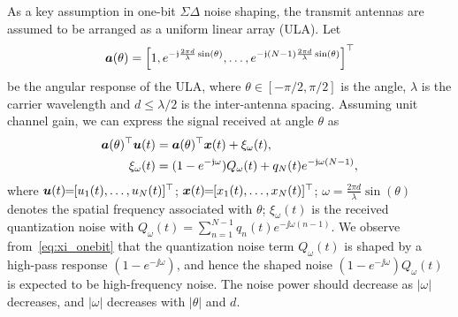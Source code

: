 \documentclass[10pt,twocolumn,twoside]{IEEEtran}
\begin{document}
As a key assumption in one-bit $\Sigma \Delta$ noise shaping, the transmit antennas are assumed to be arranged as a uniform linear array (ULA).
Let
\begin{equation}\label{eq:angular_response}
	{\bm a}(\theta) = \left[ 1,e^{-{\mathfrak j}\frac{2\pi d}{\lambda}\sin(\theta)}, \dots, e^{-{\mathfrak j}(N-1)\frac{2\pi d}{\lambda}\sin(\theta)} \right]^\top
\end{equation}
be the angular response of the ULA,
where
$\theta \in [-\pi/2,\pi/2]$ is the angle,
$\lambda$ is the carrier wavelength
and $d \le {\lambda}/{2}$ is the inter-antenna spacing.
Assuming unit channel gain, we can express the signal received at angle $\theta$ as
\begin{align}
	{\bm a}(\theta)^\top {\bm u}(t) &= {\bm a}(\theta)^\top {\bm x}(t) + \xi_\omega(t), \notag\\
	\xi_\omega(t) &= (1 - e^{-{\mathfrak j} \omega})  Q_\omega(t)  +  q_N(t) e^{- {\mathfrak j} \omega(N-1)}, \label{eq:xi_onebit}
\end{align}
where
${\bm u}(t) \!\!=\!\! [u_1(t),\dots,u_N(t)]^\top$;
${\bm x}(t) \!\!=\!\! [x_1(t),\dots,x_N(t)]^\top$;
$\omega \!=\! \frac{2\pi d}{\lambda} \sin(\theta)$ denotes the spatial frequency associated with $\theta$;
$\xi_\omega(t)$ is the received quantization noise with
$Q_\omega(t) \!=\! \sum_{n=1}^{N-1} \! q_n(t) e^{-\jj \omega(n-1)}$.
We observe from~\eqref{eq:xi_onebit} that the quantization noise term $Q_\omega(t)$ is shaped by a high-pass response $(1 - e^{-\jj \omega})$,
and hence the shaped noise $(1 - e^{-\jj \omega})  Q_\omega(t)$ is expected to be high-frequency noise.
The noise power should decrease as $|\omega|$ decreases, and $|\omega|$ decreases with $|\theta|$ and $d$.
\end{document}
